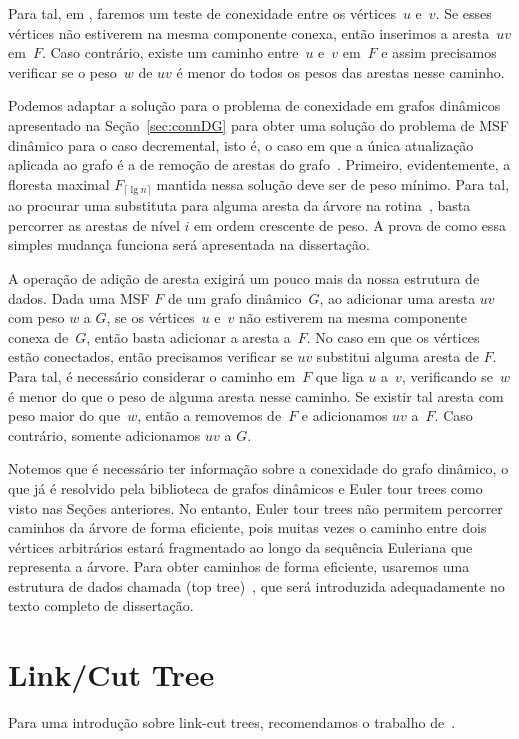 Para tal, em \MSFaddEdge, faremos um teste de conexidade entre os vértices~$u$ e~$v$.
Se esses vértices não estiverem na mesma componente conexa, então inserimos a aresta~$uv$ em~$F$.
Caso contrário, existe um caminho entre~$u$ e~$v$ em~$F$ e assim precisamos verificar se o peso~$w$ de $uv$ é menor do todos os
pesos das arestas nesse caminho.

Podemos adaptar a solução para o problema de conexidade em grafos dinâmicos apresentado na Seção~\ref{sec:connDG} para obter uma solução do problema de MSF dinâmico para o caso decremental, isto é, o caso em que a única atualização aplicada ao grafo é a de remoção de arestas do grafo~\cite{poly_log}. Primeiro, evidentemente, a floresta maximal $F_{\lceil \lg n \rceil}$ mantida nessa solução deve ser de peso mínimo. Para tal, ao procurar uma substituta para alguma aresta da árvore na rotina~\dymGraphReplace{}, basta percorrer as arestas de nível $i$ em ordem crescente de peso. A prova de como essa simples mudança funciona será apresentada na dissertação.

A operação de adição de aresta exigirá um pouco mais da nossa estrutura de dados. Dada uma MSF $F$ de um grafo dinâmico~$G$, ao adicionar uma aresta $uv$ com peso $w$ a $G$, se os vértices~$u$ e~$v$ não estiverem na mesma componente conexa de~$G$, então basta adicionar a aresta a~$F$. No caso em que os vértices estão conectados, então precisamos verificar se $uv$ substitui alguma aresta de $F$. Para tal, é necessário considerar o caminho em~$F$ que liga $u$ a~$v$, verificando se~$w$ é menor do que o peso de alguma aresta nesse caminho. Se existir tal aresta com peso maior do que~$w$, então a removemos de~$F$ e adicionamos $uv$ a~$F$. Caso contrário, somente adicionamos $uv$ a $G$.

Notemos que é necessário ter informação sobre a conexidade do grafo dinâmico, o que já é resolvido pela biblioteca de grafos dinâmicos e Euler tour trees como visto nas Seções anteriores. No entanto, Euler tour trees não permitem percorrer caminhos da árvore de forma eficiente, pois muitas vezes o caminho entre dois vértices arbitrários estará fragmentado ao longo da sequência Euleriana que representa a árvore. Para obter caminhos de forma eficiente, usaremos uma estrutura de dados chamada  (top tree)~\cite{AHLTMinDiameter}, que será introduzida adequadamente no texto completo de dissertação.


\section{Link/Cut Tree}
\label{sec:linkcuttree}

Para uma introdução sobre link-cut trees, recomendamos o trabalho de~\cite{linkcuttree}.
